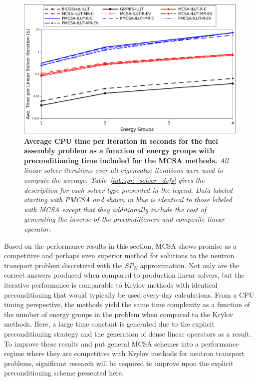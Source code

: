 \begin{figure}[t!]
  \begin{center}
    \includegraphics[width=5in]{chapters/spn_equations/solver_p_time.pdf}
  \end{center}
  \caption{\textbf{Average CPU time per iteration in seconds for the
      fuel assembly problem as a function of energy groups with
      preconditioning time included for the MCSA methods.}
    \textit{All linear solver iterations over all eigenvalue
      iterations were used to compute the
      average. Table~\ref{tab:spn_solver_defs} gives the description
      for each solver type presented in the legend. Data labeled
      starting with PMCSA and shown in blue is identical to those
      labeled with MCSA except that they additionally include the cost
      of generating the inverse of the preconditioners and composite
      linear operator.}}
  \label{fig:spn_comparison_prec_time}
\end{figure}

Based on the performance results in this section, MCSA shows promise
as a competitive and perhaps even superior method for solutions to the
neutron transport problem discretized with the $SP_N$
approximation. Not only are the correct answers produced when compared
to production linear solvers, but the iterative performance is
comparable to Krylov methods with identical preconditioning that would
typically be used every-day calculations. From a CPU timing
perspective, the methods yield the same time complexity as a function
of the number of energy groups in the problem when compared to the
Krylov methods. Here, a large time constant is generated due to the
explicit preconditioning strategy and the generation of dense linear
operators as a result. To improve these results and put general MCSA
schemes into a performance regime where they are competitive with
Krylov methods for neutron transport problems, significant research
will be required to improve upon the explicit preconditioning scheme
presented here.


